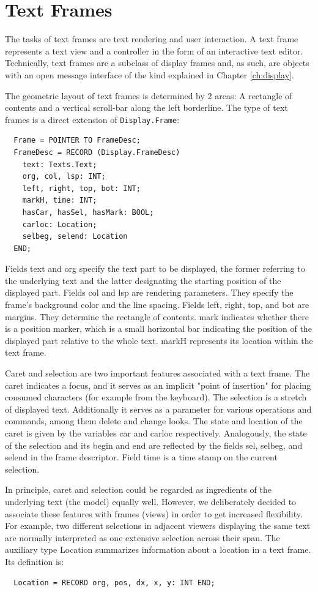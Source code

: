 \section{Text Frames}
\label{sec:textframes}
The tasks of text frames are text rendering and user interaction. A text frame represents a text view
and a controller in the form of an interactive text editor. Technically, text frames are a subclass
of display frames and, as such, are objects with an open message interface of the kind explained
in Chapter \ref{ch:display}.

The geometric layout of text frames is determined by 2 areas: A rectangle of contents and a vertical
scroll-bar along the left borderline. The type of text frames is a direct extension of \verb|Display.Frame|:
\begin{verbatim}
  Frame = POINTER TO FrameDesc;
  FrameDesc = RECORD (Display.FrameDesc)
    text: Texts.Text;
    org, col, lsp: INT;
    left, right, top, bot: INT;
    markH, time: INT;
    hasCar, hasSel, hasMark: BOOL;
    carloc: Location;
    selbeg, selend: Location
  END;
\end{verbatim}

Fields text and org specify the text part to be displayed, the former referring to the underlying text
and the latter designating the starting position of the displayed part. Fields col and lsp are rendering
parameters. They specify the frame's background color and the line spacing. Fields left, right, top,
and bot are margins. They determine the rectangle of contents. mark indicates whether there is a
position marker, which is a small horizontal bar indicating the position of the displayed part relative
to the whole text. markH represents its location within the text frame.

Caret and selection are two important features associated with a text frame. The caret indicates a
focus, and it serves as an implicit "point of insertion" for placing consumed characters (for example
from the keyboard). The selection is a stretch of displayed text. Additionally it serves as a
parameter for various operations and commands, among them delete and change looks. The state
and location of the caret is given by the variables car and carloc respectively. Analogously, the
state of the selection and its begin and end are reflected by the fields sel, selbeg, and selend in the
frame descriptor. Field time is a time stamp on the current selection.

In principle, caret and selection could be regarded as ingredients of the underlying text (the model)
equally well. However, we deliberately decided to associate these features with frames (views) in
order to get increased flexibility. For example, two different selections in adjacent viewers
displaying the same text are normally interpreted as one extensive selection across their span.
The auxiliary type Location summarizes information about a location in a text frame. Its definition is:
\begin{verbatim}
  Location = RECORD org, pos, dx, x, y: INT END;
\end{verbatim}

